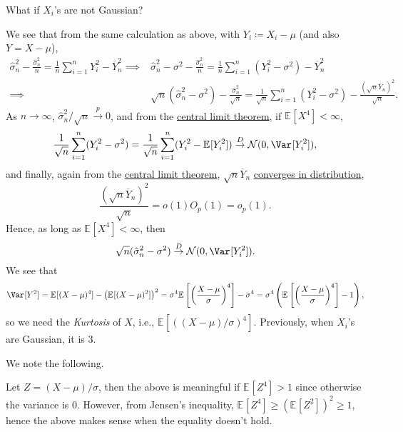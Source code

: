 \begin{problem*}
	What if \(X_i\)'s are not Gaussian?
\end{problem*}
\begin{answer}
	We see that from the same calculation as above, with \(Y_i \coloneqq X_i - \mu \) (and also \(Y = X - \mu \)),
	\[
		\begin{split}
			\hat{\sigma} _n^2 - \frac{\hat{\sigma} _n^2}{n} = \frac{1}{n} \sum_{i=1}^{n} Y_i^2 - \overline{Y} _n^2
			\implies & \hat{\sigma} _n^2 - \sigma ^2 - \frac{\hat{\sigma} _n^2}{n} = \frac{1}{n} \sum_{i=1}^{n} (Y_i^2 - \sigma ^2)- \overline{Y} _n^2                                                           \\
			\implies & \sqrt{n}(\hat{\sigma } _n^2 - \sigma ^2) - \frac{\hat{\sigma} _n^2}{\sqrt{n} } = \frac{1}{\sqrt{n} } \sum_{i=1}^{n} (Y_i^2 - \sigma ^2) - \frac{(\sqrt{n} \overline{Y} _n)^2}{\sqrt{n} }.
		\end{split}
	\]
	As \(n \to \infty \), \(\hat{\sigma} _n^2 / \sqrt{n} \overset{p}{\to } 0\), and from the \hyperref[thm:CLT]{central limit theorem}, if \(\mathbb{E}_{}[X^4] < \infty \),
	\[
		\frac{1}{\sqrt{n} } \sum_{i=1}^{n} (Y_i^2 - \sigma ^2)
		= \frac{1}{\sqrt{n} } \sum_{i=1}^{n} (Y_i^2 - \mathbb{E}_{}[Y_i^2] )
		\overset{D}{\to } \mathcal{N} (0, \Var_{}[Y_i^2] ),
	\]
	and finally, again from the \hyperref[thm:CLT]{central limit theorem}, \(\sqrt{n} \overline{Y} _n\) \hyperref[def:converge-in-distribution]{converges in distribution},
	\[
		\frac{(\sqrt{n} \overline{Y} _n) ^2}{\sqrt{n} }
		= o(1) O_p(1)
		= o_p(1).
	\]
	Hence, as long as \(\mathbb{E}_{}[X^4] < \infty \), then
	\[
		\sqrt{n} (\hat{\sigma} _n^2 - \sigma ^2)
		\overset{D}{\to } \mathcal{N} (0, \Var_{}[Y_i^2] ).
	\]
	We see that
	\[
		\Var_{}[Y^2]
		= \mathbb{E}_{}[(X - \mu )^4]  - \left( \mathbb{E}_{}[(X-\mu )^2] \right) ^2
		= \sigma ^4 \mathbb{E}_{}\left[\left( \frac{X-\mu }{\sigma } \right) ^4 \right] - \sigma ^4
		= \sigma ^4 \left( \mathbb{E}_{}\left[\left( \frac{X-\mu }{\sigma } \right) ^4 \right] - 1 \right),
	\]
	so we need the \emph{Kurtosis} of \(X\), i.e., \(\mathbb{E}_{}[( (X-\mu ) / \sigma )^4] \). Previously, when \(X_i\)'s are Gaussian, it is \(3\).
\end{answer}

We note the following.

\begin{note}
	Let \(Z = (X-\mu ) / \sigma \), then the above is meaningful if \(\mathbb{E}_{}[Z^4] > 1\) since otherwise the variance is \(0\). However, from Jensen's inequality, \(\mathbb{E}_{}[Z^4] \geq \left( \mathbb{E}_{}[Z^2] \right) ^2 \geq 1\), hence the above makes sense when the equality doesn't hold.
\end{note}

